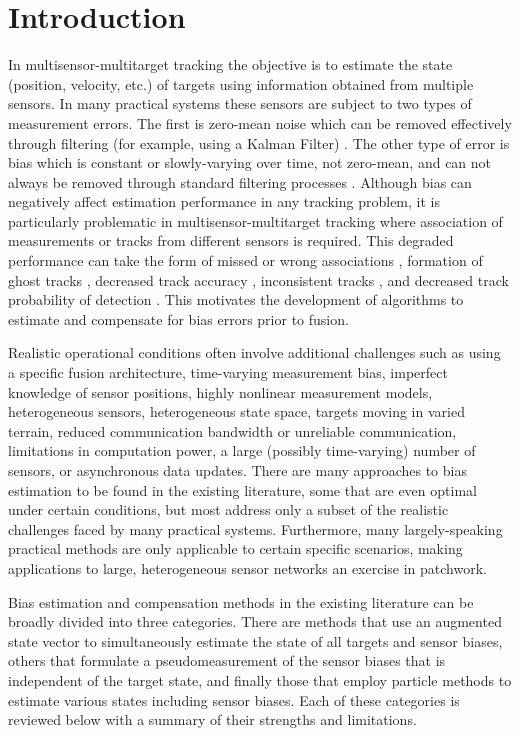 \documentclass[journal]{IEEEtran}
\begin{document}
\section{Introduction} \label{introduction}
In multisensor-multitarget tracking the objective is to estimate the state (position, velocity, etc.) of targets using information obtained from multiple sensors. In many practical systems these sensors are subject to two types of measurement errors. The first is zero-mean noise which can be removed effectively through filtering (for example, using a Kalman Filter) \cite{kalman1960new}. The other type of error is bias which is constant or slowly-varying over time, not zero-mean, and can not always be removed through standard filtering processes \cite{bar2004estimation}. Although bias can negatively affect estimation performance in any tracking problem, it is particularly problematic in multisensor-multitarget tracking where association of measurements or tracks from different sensors is required. This degraded performance can take the form of missed or wrong associations \cite{TODO}, formation of ghost tracks \cite{TODO}, decreased track accuracy \cite{TODO}, inconsistent tracks \cite{TODO}, and decreased track probability of detection \cite{TODO}. This motivates the development of algorithms to estimate and compensate for bias errors prior to fusion.

Realistic operational conditions often involve additional challenges such as using a specific fusion architecture, time-varying measurement bias, imperfect knowledge of sensor positions, highly nonlinear measurement models, heterogeneous sensors, heterogeneous state space, targets moving in varied terrain, reduced communication bandwidth or unreliable communication, limitations in computation power, a large (possibly time-varying) number of sensors, or asynchronous data updates. There are many approaches to bias estimation to be found in the existing literature, some that are even optimal under certain conditions, but most address only a subset of the realistic challenges faced by many practical systems. Furthermore, many largely-speaking practical methods are only applicable to certain specific scenarios, making applications to large, heterogeneous sensor networks an exercise in patchwork.

Bias estimation and compensation methods in the existing literature can be broadly divided into three categories. There are methods that use an augmented state vector to simultaneously estimate the state of all targets and sensor biases, others that formulate a pseudomeasurement of the sensor biases that is independent of the target state, and finally those that employ particle methods to estimate various states including sensor biases. Each of these categories is reviewed below with a summary of their strengths and limitations.
\end{document}
